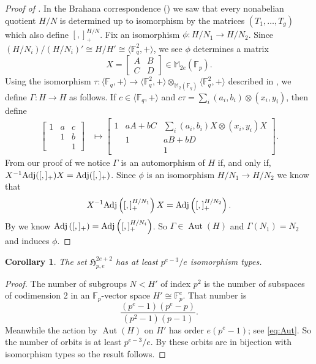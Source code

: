 \documentclass{toc}
\numberwithin{equation}{section}
\theoremstyle{plain}       %
\newtheorem{coro}[equation]{Corollary}
\theoremstyle{remark}
\theoremstyle{definition}
\numberwithin{figure}{section}
\numberwithin{table}{section}
\newcommand{\mygroups}{\mathfrak{H}}
\newcommand{\bbF}{\mathbb{F}}  %
\DeclareMathOperator{\Aut}{Aut}  %
\begin{document}
\begin{proof}[Proof of ]
In the Brahana correspondence () we saw that every
nonabelian quotient $H/N$ is determined up to isomorphism  by the matrices
$(T_1,\dots,T_g)$ which also define $[,]_+^{H/N}$.   Fix an isomorphism
$\phi:H/N_1\to H/N_2$.  Since $(H/N_i)/(H/N_i)'\cong
H/H'\cong\langle\bbF_q^2,+\rangle$, we see $\phi$ determines a matrix
\[
  X=\begin{bmatrix} A & B \\ C & D\end{bmatrix} \in \mathbb{M}_{2e}(\bbF_p).
\]
Using the isomorphism $\tau:\langle \bbF_q,+\rangle\to \langle
\bbF_q^2,+\rangle\otimes_{\mathbb{M}_2(\bbF_q)} \langle \bbF_q^2,+\rangle$
described in , we define $\Gamma:H\to H$ as follows.  If
$c\in \langle\bbF_q,+\rangle$ and $c\tau = \sum_i (a_i,b_i)\otimes (x_i,y_i)$,
then define
\begin{align*}
	\begin{bmatrix}
		1 & a & c \\ & 1 & b \\ & & 1 
	\end{bmatrix}
	& \mapsto
	\begin{bmatrix}
		1 & aA+bC & \sum_i (a_i,b_i)X\otimes (x_i,y_i)X \\ & 1 & aB+bD \\ & & 1 
	\end{bmatrix}.
\end{align*}
{}From our proof of  we notice $\Gamma$ is an automorphism of
$H$ if, and only if, $X^{-1}{\rm Adj}([,]_+)X={\rm Adj}([,]_+)$.  Since $\phi$
is an isomorphism $H/N_1\to H/N_2$ we know that
\begin{align*}
	X^{-1}{\rm Adj}\left([,]_+^{H/N_1}\right)X
	={\rm Adj}\left([,]^{H/N_2}_+\right).
\end{align*}
By  we know ${\rm Adj}\left([,]_+\right)={\rm
Adj}\left([,]_+^{H/N_i}\right)$.  So $\Gamma\in \Aut(H)$ and $\Gamma(N_1)=N_2$
and induces $\phi$.
\end{proof}


\begin{coro}\label{coro:count}
The set $\mygroups_{p,e}^{2e+2}$ has at least $p^{e-3}/e$ isomorphism types.
\end{coro}
\begin{proof}
The number of subgroups $N<H'$ of index $p^2$ is the number of subspaces of
codimension 2 in an $\bbF_p$-vector space $H'\cong \bbF_p^e$.  That number is
\[
  \frac{(p^e-1)(p^e-p)}{(p^2-1)(p-1)}.
\]
Meanwhile the action by $\Aut(H)$ on
$H'$ has order $e(p^e-1)$; see \eqref{eq:Aut}.  So the number of orbits is at
least $p^{e-3}/e$.  By  these orbits are in
bijection with isomorphism types so the result follows.
\end{proof}
\end{document}

